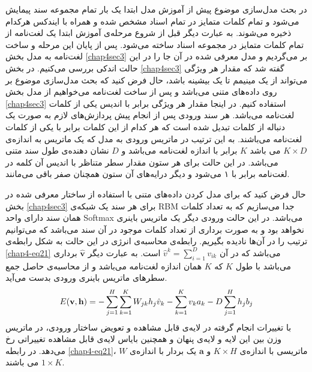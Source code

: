 در بحث مدل‌سازی موضوع پیش از آموزش مدل ابتدا یک بار تمام مجموعه سند پیمایش می‌‌شود و تمام کلمات متمایز در تمام اسناد مشخص شده و همراه با ایندکس هرکدام ذخیره می‌‌شوند. به عبارت دیگر قبل از شروع مرحله‌ی آموزش ابتدا یک لغت‌نامه از تمام کلمات متمایز در مجموعه اسناد ساخته می‌‌شود. پس از پایان این مرحله و ساخت لغت‌نامه به مدل بخش
\ref{chap4sec3}
بر می‌‌گردیم و مدل معرفی‌ شده در آن جا را در این حالت اندکی‌ بررسی‌ می‌‌کنیم. در بخش
\ref{chap4sec3}
گفته شد که مقدار هر ویژگی‌ می‌‌تواند از یک مینیمم تا یک بیشینه باشد، حال فرض کنید که بحث مدل‌سازی موضوع بر روی داده‌های متنی می‌‌باشد و پس از ساخت لغت‌نامه می‌خواهیم از مدل بخش
\ref{chap4sec3}
استفاده کنیم. در اینجا مقدار هر ویژگی‌ برابر با اندیس یکی‌ از کلمات لغت‌نامه می‌‌باشد. هر سند ورودی پس از انجام پیش پردازش‌های لازم به صورت یک دنباله از کلمات تبدیل شده است که هر کدام از این کلمات برابر با یکی‌ از کلمات لغت‌نامه می‌‌باشند. به این ترتیب در ماتریس ورودی به مدل که یک ماتریس به انداز‌ه‌ی
$K \times D$
می‌ باشد
$K$
برابر با اندازه لغت‌نامه می‌‌باشد و
$D$
نشان دهنده‌ی طول سند متنی می‌‌باشد. در این حالت برای هر ستون مقدار سطر متناظر با اندیس آن کلمه در لغت‌نامه برابر با ۱ می‌‌شود و دیگر درایه‌های آن ستون همچنان صفر باقی‌ می‌‌مانند.

حال فرض کنید که برای مدل کردن داده‌های متنی با استفاده از ساختار معرفی‌ شده در بخش
\ref{chap4sec3}
برای هر سند یک شبکه‌ی
RBM
جدا می‌‌سازیم که به تعداد کلمات همان سند دارای واحد
Softmax
می‌باشد. در این حالت ورودی دیگر یک ماتریس باینری نخواهد بود و به صورت برداری از تعداد کلمات موجود در آن سند می‌‌باشد که می‌‌توانیم ترتیب را در آن‌ها نادیده بگیریم. رابطه‌ی محاسبه‌ی انرژی در این حالت به شکل رابطه‌ی
\ref{chap4-eq21}
می‌‌باشد که در آن
$\hat{v}^k = \sum_{i=1}^{D}v_{ik}$
است. به عبارت دیگر
$\hat{\textbf{v}}$
برداری می‌‌باشد با طول
$K$
که 
$K$
همان اندازه لغت‌نامه می‌‌باشد و از محاسبه‌ی حاصل جمع سطر‌های ماتریس باینری ورودی بدست می‌‌آید.
\begin{align}
	\centering
	\label{chap4-eq21}
	E(\textbf{v},\textbf{h})=-\sum_{j=1}^{H}\sum_{k=1}^{K}W_{jk}h_j\hat{v}_{k}-\sum_{k=1}^{K}v_{k}a_{k} - D\sum_{j=1}^{H}h_jb_j
\end{align}
با تغییرات انجام گرفته در لایه‌ی قابل مشاهده و تعویض ساختار ورودی، در ماتریس وزن بین این لایه و لایه‌ی پنهان و همچنین بایاس لایه‌ی قابل مشاهده تغییراتی‌ رخ می‌‌دهد. در رابطه
\ref{chap4-eq21}، $W$
ماتریسی با اندازه‌ی
$K \times H$
و
$\textbf{a}$
یک بردار با اندازه‌ی
$1 \times K$
می‌ باشند.

